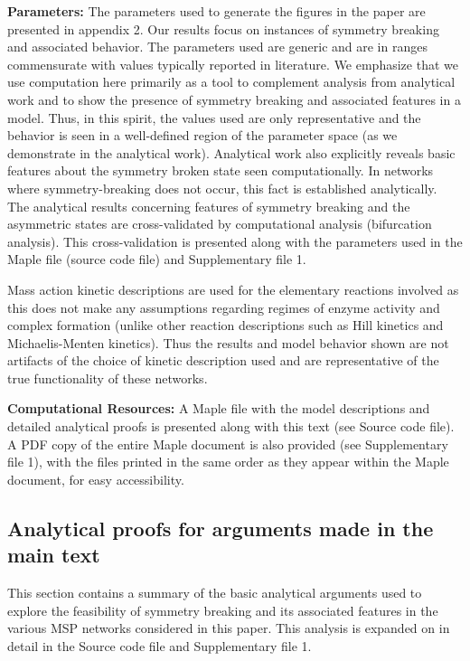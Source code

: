 \documentclass[9pt,lineno]{elife}
\begin{document}
\begin{appendixbox}
\textbf{Parameters:} %
The parameters used to generate the figures in the paper are presented in appendix 2. Our results focus on instances of symmetry breaking and associated behavior. The parameters used are generic and are in ranges commensurate with values typically reported in literature. We emphasize that we use computation here primarily as a tool to complement analysis from analytical work and to show the presence of symmetry breaking and associated features in a model. Thus, in this spirit, the values used are only representative and the behavior is seen in a well-defined region of the  parameter space (as we demonstrate in the analytical work). Analytical work also explicitly reveals basic features about the symmetry broken state seen computationally. In networks where symmetry-breaking does not occur, this fact is established analytically.
The analytical results concerning features of symmetry breaking and the asymmetric states are cross-validated by computational analysis (bifurcation analysis). This cross-validation is presented along with the parameters used in the Maple file (source code file) and Supplementary file 1.

Mass action kinetic descriptions are used for the elementary reactions involved as this does not make any assumptions regarding regimes of enzyme activity and complex formation (unlike other reaction descriptions such as Hill kinetics and Michaelis-Menten kinetics). Thus the results and model behavior shown are not artifacts of the choice of kinetic description used and are representative of  the true functionality of these networks.

\textbf{Computational Resources:} A Maple file with the model descriptions and detailed analytical proofs is presented along with this text (see Source code file). A PDF copy of the entire Maple document is also provided (see Supplementary file 1), with the files printed in the same order as they appear within the Maple document, for easy accessibility.

\subsection*{Analytical proofs for arguments made in the main text}

This section contains a summary of the basic analytical arguments used to explore the feasibility of symmetry breaking and its associated features in the various MSP networks considered in this paper. This analysis is expanded on in detail in the Source code file and Supplementary file 1.


\end{appendixbox}
\end{document}
